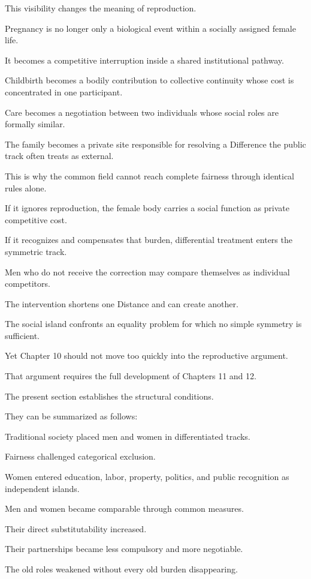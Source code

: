 This visibility changes the meaning of reproduction.

Pregnancy is no longer only a biological event within a socially assigned female life.

It becomes a competitive interruption inside a shared institutional pathway.

Childbirth becomes a bodily contribution to collective continuity whose cost is concentrated in one participant.

Care becomes a negotiation between two individuals whose social roles are formally similar.

The family becomes a private site responsible for resolving a Difference the public track often treats as external.

This is why the common field cannot reach complete fairness through identical rules alone.

If it ignores reproduction, the female body carries a social function as private competitive cost.

If it recognizes and compensates that burden, differential treatment enters the symmetric track.

Men who do not receive the correction may compare themselves as individual competitors.

The intervention shortens one Distance and can create another.

The social island confronts an equality problem for which no simple symmetry is sufficient.

Yet Chapter 10 should not move too quickly into the reproductive argument.

That argument requires the full development of Chapters 11 and 12.

The present section establishes the structural conditions.

They can be summarized as follows:

Traditional society placed men and women in differentiated tracks.

Fairness challenged categorical exclusion.

Women entered education, labor, property, politics, and public recognition as independent islands.

Men and women became comparable through common measures.

Their direct substitutability increased.

Their partnerships became less compulsory and more negotiable.

The old roles weakened without every old burden disappearing.

